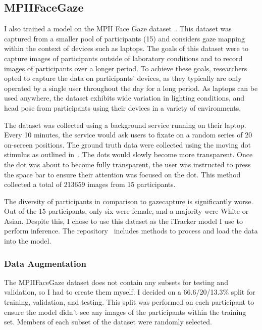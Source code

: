 \documentclass[twocolumn]{report}
\begin{document}
\subsection{MPIIFaceGaze}

I also trained a model on the MPII Face Gaze dataset~\cite{zhang2019mpii}. This dataset was captured from a smaller pool of participants (15) and considers gaze mapping within the context of devices such as laptops. The goals of this dataset were to capture images of participants outside of laboratory conditions and to record images of participants over a longer period. To achieve these goals, researchers opted to capture the data on participants' devices, as they typically are only operated by a single user throughout the day for a long period. As laptops can be used anywhere, the dataset exhibits wide variation in lighting conditions, and head pose from participants using their devices in a variety of environments. 

The dataset was collected using a background service running on their laptop. Every 10 minutes, the service would ask users to fixate on a random series of 20 on-screen positions. The ground truth data were collected using the moving dot stimulus as outlined in~\cite{kassner2014pupil}. The dots would slowly become more transparent. Once the dot was about to become fully transparent, the user was instructed to press the space bar to ensure their attention was focused on the dot. This method collected a total of 213659 images from 15 participants. 

The diversity of participants in comparison to gazecapture is significantly worse. Out of the 15 participants, only six were female, and a majority were White or Asian. Despite this, I chose to use this dataset as the iTracker model I use to perform inference. The repository~\cite{krafka2016eye,cheng2021survey} includes methods to process and load the data into the model. 

\subsubsection{Data Augmentation}

The MPIIFaceGaze dataset does not contain any subsets for testing and validation, so I had to create them myself. I decided on a 66.6/20/13.3\% split for training, validation, and testing. This split was performed on each participant to ensure the model didn't see any images of the participants within the training set. Members of each subset of the dataset were randomly selected. 
\end{document}
